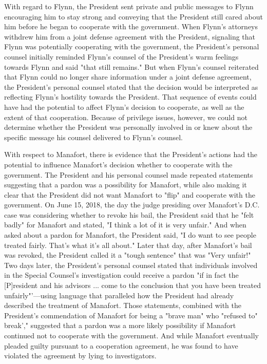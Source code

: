 With regard to Flynn, the President sent private and public messages to Flynn encouraging him to stay strong and conveying that the President still cared about him before he began to cooperate with the government.
When Flynn's attorneys withdrew him from a joint defense agreement with the President, signaling that Flynn was potentially cooperating with the government, the President's personal counsel initially reminded Flynn's counsel of the President's warm feelings towards Flynn and said "that still remains."
But when Flynn's counsel reiterated that Flynn could no longer share information under a joint defense agreement, the President's personal counsel stated that the decision would be interpreted as reflecting Flynn's hostility towards the President.
That sequence of events could have had the potential to affect Flynn's decision to cooperate, as well as the extent of that cooperation.
Because of privilege issues, however, we could not determine whether the President was personally involved in or knew about the specific message his counsel delivered to Flynn's counsel.

With respect to Manafort, there is evidence that the President's actions had the potential to influence Manafort's decision whether to cooperate with the government.
The President and his personal counsel made repeated statements suggesting that a pardon was a possibility for Manafort, while also making it clear that the President did not want Manafort to "flip" and cooperate with the government.
On June 15, 2018, the day the judge presiding over Manafort's D.C. case was considering whether to revoke his bail, the President said that he "felt badly" for Manafort and stated, "I think a lot of it is very unfair."
And when asked about a pardon for Manafort, the President said, "I do want to see people treated fairly.
That's what it's all about." Later that day, after Manafort's bail was revoked, the President called it a "tough sentence" that was "Very unfair!"
Two days later, the President's personal counsel stated that individuals involved in the Special Counsel's investigation could receive a pardon "if in fact the [P]resident and his advisors ... come to the conclusion that you have been treated unfairly"'—using language that paralleled how the President had already described the treatment of Manafort.
Those statements, combined with the President's commendation of Manafort for being a "brave man" who "refused to" break'," suggested that a pardon was a more likely possibility if Manafort continued not to cooperate with the government.
And while Manafort eventually pleaded guilty pursuant to a cooperation agreement, he was found to have violated the agreement by lying to investigators.

